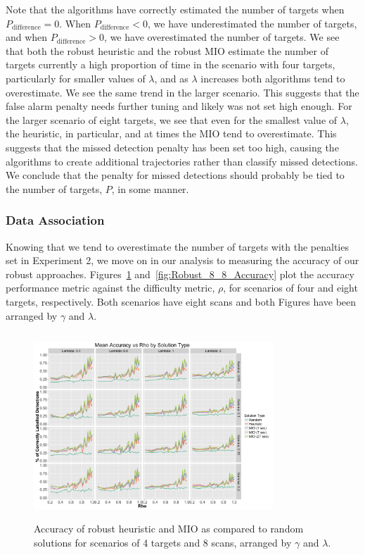 \documentclass[journal]{IEEEtran}
\begin{document}
Note that the algorithms have correctly estimated the number of targets when $P_{\text{difference}} = 0$. When $P_{\text{difference}} < 0$, we have underestimated the number of targets, and when $P_{\text{difference}} > 0$, we have overestimated the number of targets. We see that both the robust heuristic and the robust MIO estimate the number of targets currently a high proportion of time in the scenario with four targets, particularly for smaller values of $\lambda$, and as $\lambda$ increases both algorithms tend to overestimate. We see the same trend in the larger scenario. This suggests that the false alarm penalty needs further tuning and likely was not set high enough. For the larger scenario of eight targets, we see that even for the smallest value of $\lambda$, the heuristic, in particular, and at times the MIO tend to overestimate. This suggests that the missed detection penalty has been set too high, causing the algorithms to create additional trajectories rather than classify missed detections. We conclude that the penalty for missed detections should probably be tied to the number of targets, $P$, in some manner. 

\subsubsection{Data Association}
Knowing that we tend to overestimate the number of targets with the penalties set in Experiment 2, we move on in our analysis to measuring the accuracy of our robust approaches. Figures~\ref{fig:Robust_4_8_Accuracy} and~\ref{fig:Robust_8_8_Accuracy} plot the accuracy performance metric against the difficulty metric, $\rho$, for scenarios of four and eight targets, respectively. Both scenarios have eight scans and both Figures have been arranged by $\gamma$ and $\lambda$.
\begin{figure}[h]
  \centering
  \includegraphics[width=9cm, height=7cm]{4_8_Accuracy}
  \caption{Accuracy of robust heuristic and MIO as compared to random solutions for scenarios of 4 targets and 8 scans, arranged by $\gamma$ and $\lambda$.}
  \label{fig:Robust_4_8_Accuracy}
\end{figure}
\end{document}
